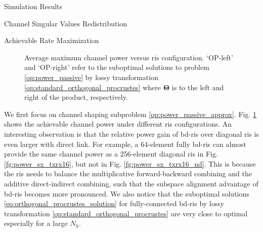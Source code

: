 \documentclass[journal]{IEEEtran}
\begin{document}
\begin{section}{Simulation Results}
\begin{subsection}{Channel Singular Values Redistribution}
	\end{subsection}

	\begin{subsection}{Achievable Rate Maximization}
		\begin{figure}[!t]
			\centering
			\caption{
				Average maximum channel power versus \gls{ris} configuration.
				`OP-left' and `OP-right' refer to the suboptimal solutions to problem \eqref{op:power_passive} by lossy transformation \eqref{op:standard_orthogonal_procrustes} where $\mathbf{\Theta}$ is to the left and right of the product, respectively.
			}
			\label{fg:power_sx}
		\end{figure}

		We first focus on channel shaping subproblem \eqref{op:power_passive_approx}.
		Fig. \ref{fg:power_sx} shows the achievable channel power under different \gls{ris} configurations.
		An interesting observation is that the relative power gain of \gls{bd}-\gls{ris} over diagonal \gls{ris} is even larger with direct link.
		For example, a 64-element fully \gls{bd}-\gls{ris} can almost provide the same channel power as a 256-element diagonal \gls{ris} in Fig. \ref{fg:power_sx_txrx16}, but not in Fig. \ref{fg:power_sx_txrx16_nd}.
		This is because the \gls{ris} needs to balance the multiplicative forward-backward combining and the additive direct-indirect combining, such that the subspace alignment advantage of \gls{bd}-\gls{ris} becomes more pronounced.
		We also notice that the suboptimal solutions \eqref{eq:orthogonal_procrustes_solution} for fully-connected \gls{bd}-\gls{ris} by lossy transformation \eqref{op:standard_orthogonal_procrustes} are very close to optimal especially for a large $N_\mathrm{S}$.


\end{subsection}
\end{section}
\end{document}
